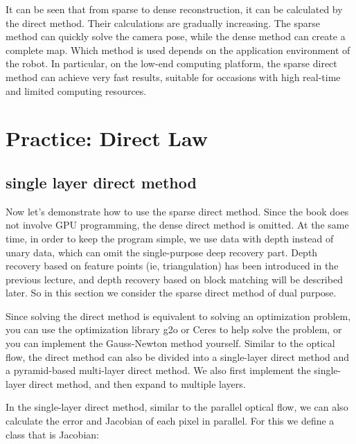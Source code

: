 It can be seen that from sparse to dense reconstruction, it can be calculated by the direct method. Their calculations are gradually increasing. The sparse method can quickly solve the camera pose, while the dense method can create a complete map. Which method is used depends on the application environment of the robot. In particular, on the low-end computing platform, the sparse direct method can achieve very fast results, suitable for occasions with high real-time and limited computing resources\textsuperscript{\cite{Engel2016}}.

\section{Practice: Direct Law}
\subsection{single layer direct method}
Now let's demonstrate how to use the sparse direct method. Since the book does not involve GPU programming, the dense direct method is omitted. At the same time, in order to keep the program simple, we use data with depth instead of unary data, which can omit the single-purpose deep recovery part. Depth recovery based on feature points (ie, triangulation) has been introduced in the previous lecture, and depth recovery based on block matching will be described later. So in this section we consider the sparse direct method of dual purpose.

Since solving the direct method is equivalent to solving an optimization problem, you can use the optimization library g2o or Ceres to help solve the problem, or you can implement the Gauss-Newton method yourself. Similar to the optical flow, the direct method can also be divided into a single-layer direct method and a pyramid-based multi-layer direct method. We also first implement the single-layer direct method, and then expand to multiple layers.

In the single-layer direct method, similar to the parallel optical flow, we can also calculate the error and Jacobian of each pixel in parallel. For this we define a class that is Jacobian:

